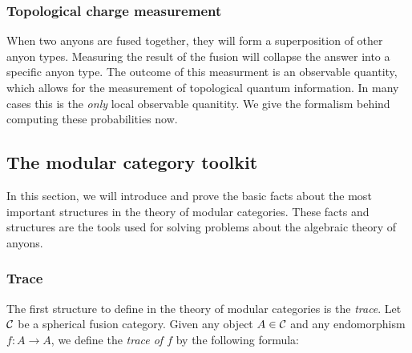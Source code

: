 \subsubsection{Topological charge measurement}

When two anyons are fused together, they will form a superposition of other anyon types. Measuring the result of the fusion will collapse the answer into a specific anyon type. The outcome of this measurment is an observable quantity, which allows for the measurement of topological quantum information. In many cases this is the \textit{only} local observable quanitity. We give the formalism behind computing these probabilities now.


 


\subsection{The modular category toolkit}

In this section, we will introduce and prove the basic facts about the most important structures in the theory of modular categories. These facts and structures are the tools used for solving problems about the algebraic theory of anyons. 


\subsubsection{Trace}

The first structure to define in the theory of modular categories is the \textit{trace}. Let ${\mathcal C}$ be a spherical fusion category. Given any object $A\in {\mathcal C}$ and any endomorphism $f:A\to A$, we define the \textit{trace of $f$} by the following formula:


